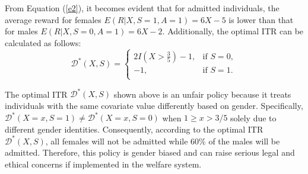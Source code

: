 \documentclass[12pt]{article}
\theoremstyle{plain}
\theoremstyle{definition}
\theoremstyle{remark}
\begin{document}
From Equation (\ref{e2}), it becomes evident that for  admitted individuals, the average reward for females $E(R|X, S=1, A=1)=6X-5$ is lower than that for males $E(R|X, S=0, A=1)=6X-2$.
Additionally, the optimal ITR can be calculated as follows:
 $$\mathcal{D}^*(X,{S})=
\begin{cases}
2I(X>\frac{3}{5})-1, & \text{if }  S = 0, \\
-1, & \text{if } S = 1. \\
\end{cases}$$

The optimal ITR $\mathcal{D}^*(X, S)$ shown above is an unfair policy because it treats individuals with the same covariate value differently based on gender.  Specifically, $\mathcal{D}^*(X={x},S=1)\neq \mathcal{D}^*(X={x},S=0)$ when $1 \geq x >3 / 5$ solely due to different gender identities. Consequently, according to the optimal ITR $\mathcal{D}^*(X, S)$, all females will not be admitted while   $60\%$ of the males will  be admitted. Therefore, this policy is gender biased and can raise serious legal and ethical concerns if implemented in the  welfare system.
\end{document}
